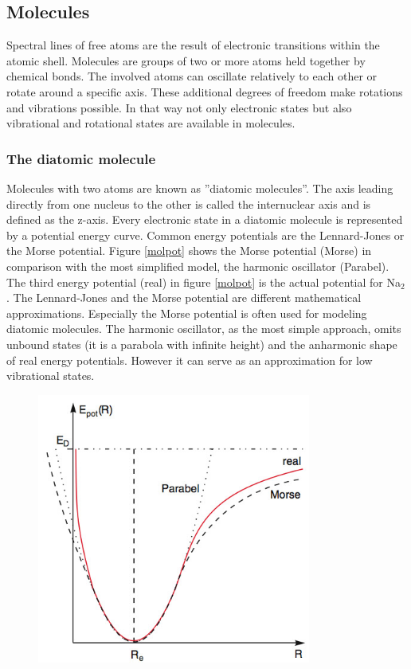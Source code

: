 \documentclass[parskip,12pt,headsepline,a4paper] {scrbook}
\begin{document}
\subsection{Molecules}
\vspace{-1\baselineskip}
Spectral lines of free atoms are the result of electronic transitions within the atomic shell. Molecules are groups of two or more atoms held together by chemical bonds. The involved atoms can oscillate relatively to each other or rotate around a specific axis. These additional degrees of freedom make rotations and vibrations possible. In that way not only electronic states but also vibrational and rotational states are available in molecules. \\

\subsubsection{The diatomic molecule}
\vspace{-1\baselineskip}
Molecules with two atoms are known as ''diatomic molecules''. The axis leading directly from one nucleus to the other is called the internuclear axis and is defined as the z-axis. Every electronic state in a diatomic molecule is represented by a potential energy curve. Common energy potentials are the Lennard-Jones or the Morse potential. Figure \ref{molpot} shows the Morse potential (Morse) in comparison with the most simplified model, the harmonic oscillator (Parabel). The third energy potential (real) in figure \ref{molpot} is the actual potential for Na$_2$.
The Lennard-Jones and the Morse potential are different mathematical approximations. Especially the Morse potential is often used for modeling diatomic molecules. The harmonic oscillator, as the most simple approach, omits unbound states (it is a parabola with infinite height) and the anharmonic shape of real energy potentials. However it can serve as an approximation for low vibrational states.

\begin{figure}[ht]
\centerline{
\includegraphics[width=9cm]{./spectroscopy/molecular-potential.jpg}}
\end{figure}
\end{document}
